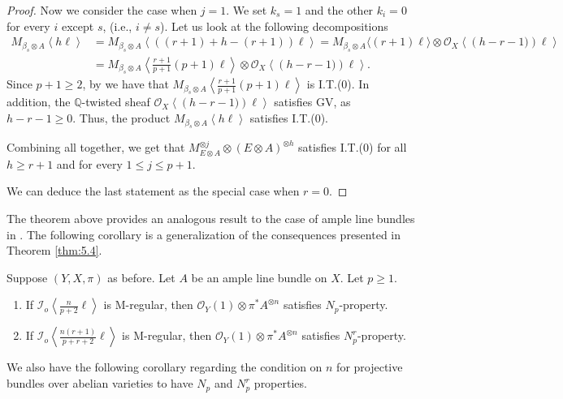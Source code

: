\documentclass[11pt,letter]{amsart}
\numberwithin{equation}{section}
\begin{document}
\begin{proof}
Now we consider the case when $j=1$. We set $k_s=1$ and the other $k_i=0$ for every $i$ except $s$, (i.e., $i\neq s$). 
Let us look at the following decompositions
   \begin{align*}
       M_{\beta_s\otimes A}\left\langle h\ell\right\rangle&
     =  M_{\beta_s\otimes A}\left\langle ((r+1)+ h-(r+1))\ell\right\rangle
       = M_{\beta_s\otimes A}\langle (r+1)\ell\rangle\otimes\mathcal{O}_X\left\langle \left( h-r-1)\right)\ell\right\rangle\\
       &= M_{\beta_s\otimes A}\left\langle\frac{r+1}{p+1}(p+1)\ell\right\rangle\otimes \mathcal{O}_X\left\langle \left(h-r-1)\right)\ell\right\rangle.
   \end{align*}
   Since $p+1\geq 2$, by \cite[Proposition 6.2]{Ito22} we have that $M_{\beta_s\otimes A}\left\langle\frac{r+1}{p+1}(p+1)\ell\right\rangle$ is I.T.(0). In addition, the $\mathbb{Q}$-twisted sheaf $\mathcal{O}_X\left\langle \left(h-r-1)\right)\ell\right\rangle$ satisfies GV, as $h-r-1\geq 0$. Thus, the product $M_{\beta_s\otimes A}\left\langle h\ell\right\rangle$ satisfies I.T.(0). 
   
   Combining all together, we get that $M_{E\otimes A}^{\otimes j}\otimes (E\otimes A)^{\otimes h}$ satisfies I.T.(0) for all $h\geq r+1$ and for every $1\leq j\leq p+1$.

We can deduce the last statement as the special case when $r=0$. %
\end{proof}

The theorem above provides an analogous result to the case of ample line bundles in \cite[Theorem 1.5]{Ito22}. 
The following corollary is a generalization of the consequences presented in Theorem \ref{thm:5.4}.
\begin{cor}
Suppose $(Y,X,\pi)$ as before. 
Let $A$ be an ample line bundle on $X$. Let $p\geq 1$.
\begin{enumerate}
\item If $\mathcal{I}_o\left\langle \frac{n}{p+2}\ell\right\rangle$ is M-regular, then $\mathcal{O}_Y(1)\otimes\pi^*A^{\otimes n}$ satisfies $N_p$-property. 
\item If $\mathcal{I}_o\left\langle \frac{n(r+1)}{p+r+2}\ell\right\rangle$ is M-regular, then $\mathcal{O}_Y(1)\otimes\pi^*A^{\otimes n}$ satisfies $N_p^r$-property. 
\end{enumerate}
\end{cor}

We also have the following corollary regarding the condition on $n$ for projective bundles over abelian varieties to have $N_p$ and $N_p^r$ properties. 
\end{document}
